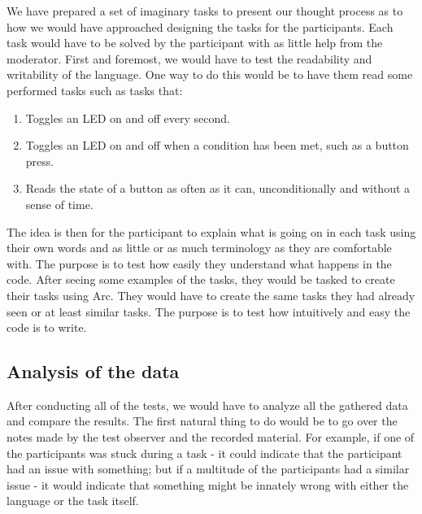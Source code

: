 We have prepared a set of imaginary tasks to present our thought process as to how we would have approached designing the tasks for the participants. Each task would have to be solved by the participant with as little help from the moderator. First and foremost, we would have to test the readability and writability of the language. One way to do this would be to have them read some performed tasks such as tasks that:

\begin{enumerate}
    \item Toggles an LED on and off every second.
    \item Toggles an LED on and off when a condition has been met, such as a button press.
    \item Reads the state of a button as often as it can, unconditionally and without a sense of time.
\end{enumerate}

The idea is then for the participant to explain what is going on in each task using their own words and as little or as much terminology as they are comfortable with. The purpose is to test how easily they understand what happens in the code. After seeing some examples of the tasks, they would be tasked to create their tasks using Arc. They would have to create the same tasks they had already seen or at least similar tasks. The purpose is to test how intuitively and easy the code is to write.

\subsection{Analysis of the data}\label{subsubsec:analysisOfTheData}

After conducting all of the tests, we would have to analyze all the gathered data and compare the results. The first natural thing to do would be to go over the notes made by the test observer and the recorded material. For example, if one of the participants was stuck during a task - it could indicate that the participant had an issue with something; but if a multitude of the participants had a similar issue - it would indicate that something might be innately wrong with either the language or the task itself.

